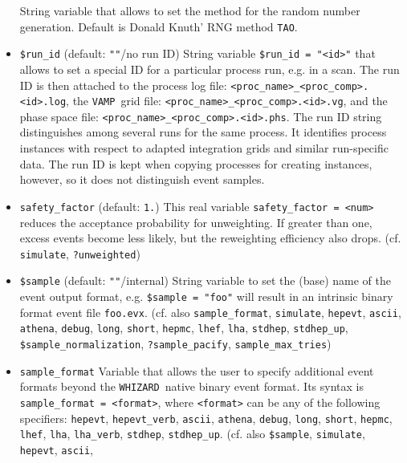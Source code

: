 \documentclass[12pt]{book}
\newcommand{\ttt}[1]{\texttt{#1}}
\newcommand{\whizard}{\texttt{WHIZARD}}
\newcommand{\vamp}{\texttt{VAMP}}
\begin{document}
\begin{itemize}
String variable that allows to set the method for the random number
generation. Default is Donald Knuth' RNG method \ttt{TAO}. 
\item
\ttt{\$run\_id} \qquad (default: \ttt{""}/no run ID) \newline
String variable \ttt{\$run\_id = "<id>"} that allows to set a special
ID for a particular process run, e.g. in a scan. The run ID is then
attached to the process log file: \newline
\ttt{<proc\_name>\_<proc\_comp>.<id>.log}, the \vamp\ grid file:
\newline 
\ttt{<proc\_name>\_<proc\_comp>.<id>.vg}, and the phase space file:
\newline 
\ttt{<proc\_name>\_<proc\_comp>.<id>.phs}. The run ID string
distinguishes among several runs for the same process.  It identifies
process instances with respect to adapted integration grids and
similar run-specific data.  The run ID is kept when copying processes
for creating instances, however, so it does not distinguish event
samples.  
\item
\ttt{safety\_factor} \qquad (default: \ttt{1.}) \newline
This real variable \ttt{safety\_factor = <num>} reduces the acceptance
probability for unweighting.  If greater than one, excess events
become less likely, but the reweighting efficiency also
drops. (cf. \ttt{simulate}, \ttt{?unweighted})
\item
\ttt{\$sample} \qquad (default: \ttt{""}/internal) \newline
String variable to set the (base) name of the event output format,
e.g. \ttt{\$sample = "foo"} will result in an intrinsic binary format
event file \ttt{foo.evx}. (cf. also \ttt{sample\_format},
\ttt{simulate}, \ttt{hepevt}, \ttt{ascii},
\ttt{athena}, \ttt{debug}, \ttt{long}, \ttt{short}, \ttt{hepmc}, 
\ttt{lhef}, \ttt{lha}, \ttt{stdhep}, \ttt{stdhep\_up},
\ttt{\$sample\_normalization}, \ttt{?sample\_pacify}, \ttt{sample\_max\_tries}) 
\item
\ttt{sample\_format} \newline
Variable that allows the user to specify additional event formats
beyond the \whizard\ native binary event format. Its syntax is 
\ttt{sample\_format = <format>}, where \ttt{<format>} can be any of
the following specifiers: \ttt{hepevt}, \ttt{hepevt\_verb}, \ttt{ascii},
\ttt{athena}, \ttt{debug}, \ttt{long}, \ttt{short}, \ttt{hepmc}, 
\ttt{lhef}, \ttt{lha}, \ttt{lha\_verb}, \ttt{stdhep}, \ttt{stdhep\_up}.
(cf. also \ttt{\$sample}, \ttt{simulate}, \ttt{hepevt}, \ttt{ascii},

\end{itemize}
\end{document}
